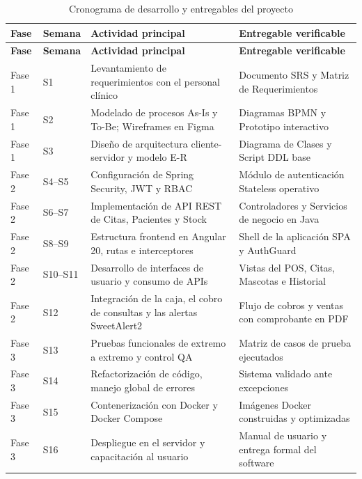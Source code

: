 \documentclass[11pt,a4paper]{report}
\begin{document}
\begin{longtable}{@{}p{1.3cm} p{1.5cm} p{7.4cm} p{4.4cm}@{}}
\caption{Cronograma de desarrollo y entregables del proyecto}\label{tab:cronograma}\\
\toprule
\textbf{Fase} & \textbf{Semana} & \textbf{Actividad principal} & \textbf{Entregable verificable} \\
\midrule
\endfirsthead
\toprule
\textbf{Fase} & \textbf{Semana} & \textbf{Actividad principal} & \textbf{Entregable verificable} \\
\midrule
\endhead
\bottomrule
\endfoot
Fase 1 & S1 & Levantamiento de requerimientos con el personal clínico & Documento SRS y Matriz de Requerimientos \\
\addlinespace
Fase 1 & S2 & Modelado de procesos As-Is y To-Be; Wireframes en Figma & Diagramas BPMN y Prototipo interactivo \\
\addlinespace
Fase 1 & S3 & Diseño de arquitectura cliente-servidor y modelo E-R & Diagrama de Clases y Script DDL base \\
\addlinespace
Fase 2 & S4--S5 & Configuración de Spring Security, JWT y RBAC & Módulo de autenticación Stateless operativo \\
\addlinespace
Fase 2 & S6--S7 & Implementación de API REST de Citas, Pacientes y Stock & Controladores y Servicios de negocio en Java \\
\addlinespace
Fase 2 & S8--S9 & Estructura frontend en Angular 20, rutas e interceptores & Shell de la aplicación SPA y AuthGuard \\
\addlinespace
Fase 2 & S10--S11 & Desarrollo de interfaces de usuario y consumo de APIs & Vistas del POS, Citas, Mascotas e Historial \\
\addlinespace
Fase 2 & S12 & Integración de la caja, el cobro de consultas y las alertas SweetAlert2 & Flujo de cobros y ventas con comprobante en PDF \\
\addlinespace
Fase 3 & S13 & Pruebas funcionales de extremo a extremo y control QA & Matriz de casos de prueba ejecutados \\
\addlinespace
Fase 3 & S14 & Refactorización de código, manejo global de errores & Sistema validado ante excepciones \\
\addlinespace
Fase 3 & S15 & Contenerización con Docker y Docker Compose & Imágenes Docker construidas y optimizadas \\
\addlinespace
Fase 3 & S16 & Despliegue en el servidor y capacitación al usuario & Manual de usuario y entrega formal del software \\
\end{longtable}
\end{document}
